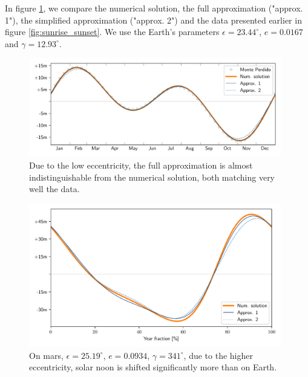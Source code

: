 \documentclass[12pt]{article}
\begin{document}
In figure \ref{fig:noon_computed_Earth}, we compare the numerical solution, 
the full approximation ("approx. 1"), the simplified approximation 
("approx. 2") and the data presented earlier in figure \ref{fig:sunrise_sunset}. 
We use the Earth's parameters $\epsilon=23.44^\circ$, $e=0.0167$ and
$\gamma=12.93^\circ$.

\begin{figure}[h]
    \centering
    \includegraphics[width=0.98\textwidth]{./figures/noon_computed_Earth.pdf}
    \caption{
        Due to the low eccentricity, the full approximation is almost 
        indistinguishable from the numerical solution, both matching very 
        well the data.
    }
    \label{fig:noon_computed_Earth}
\end{figure}

\begin{figure}[ht]
    \centering
    \includegraphics[width=0.98\textwidth]{./figures/noon_computed_Mars.pdf}
    \caption{
        On mars, $\epsilon=25.19^\circ$, $e=0.0934$, $\gamma=341^\circ$, 
        due to the higher eccentricity, solar noon is shifted significantly 
        more than on Earth.
    }
    \label{fig:noon_computed_Mars}
\end{figure}
\end{document}
